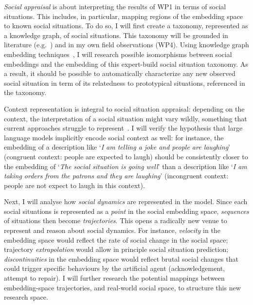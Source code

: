 \emph{Social appraisal} is about interpreting the results of WP1
in terms of social situations. This includes, in particular, mapping regions of
the embedding space to known social situations.
To do so, I will first create a taxonomy, represented as a knowledge graph, of
social situations. This taxonomy will be grounded in literature
(e.g.~\cite{kelley2003atlas}) and in my own field observations (WP4).  Using
knowledge graph embedding techniques~\cite{ji2022survey}, I will research
possible isomorphisms between social embeddings and the embedding of this
expert-build social situation taxonomy. As a result, it should be possible to
automatically characterize any new observed social situation in term of its
relatedness to prototypical situations, referenced in the taxonomy.

Context representation is integral to social situation appraisal: depending on
the context, the interpretation of a social situation might vary wildly,
something that current approaches struggle to represent~\cite{yang2018grand}. I
will verify the hypothesis that large language models implicitly encode social
context as well: for instance, the embedding of a description like `\emph{I am
telling a joke and people are laughing}' (congruent context: people are expected
to laugh) should be consistently closer to the embedding of `\emph{The social
situation is going well}' than a description like `\emph{I am taking orders from
the patrons and they are laughing}' (incongruent context: people are not expect
to laugh in this context).

Next, I will analyse how \emph{social dynamics} are represented in the \project
model. Since each social situations is represented as a \emph{point} in the
social embedding space, \emph{sequences} of situations then become
\emph{trajectories}. This opens a radically new venue to represent and reason
about social dynamics. For instance, \emph{velocity} in the embedding space
would reflect the rate of social change in the social space; trajectory
\emph{extrapolation} would allow in principle social situation prediction;
\emph{discontinuities} in the embedding space would reflect brutal social
changes that could trigger specific behaviours by the artificial agent
(acknowledgement, attempt to repair).  I will further research the potential
mappings between embedding-space trajectories, and real-world social space, to
structure this new research space.

